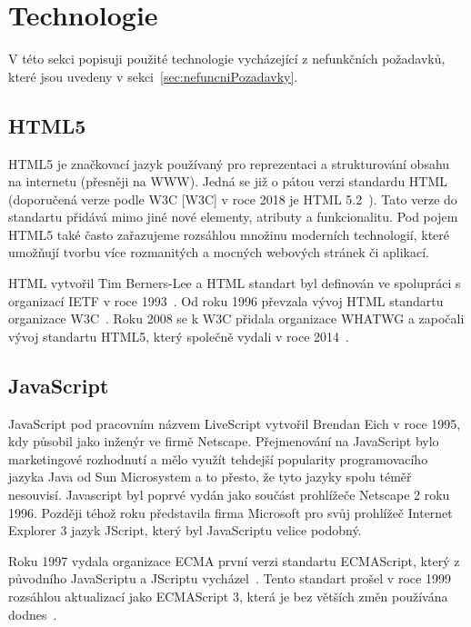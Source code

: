 
\section{Technologie}\label{sec:technologie}
V této sekci popisuji použité technologie vycházející z nefunkčních požadavků, které jsou uvedeny v sekci~\ref{sec:nefuncniPozadavky}.

\subsection{HTML5}\label{subsec:html5}

HTML5 je značkovací jazyk používaný pro reprezentaci a strukturování  obsahu na internetu (přesněji na \acrshort{WWW}).
Jedná se již o pátou verzi standardu \gls{HTML} (doporučená verze podle \acrlong{W3C} [\acrshort{W3C}] v roce 2018 je HTML 5.2~\cite{w3c:html52}).
Tato verze do standartu přidává mimo jiné nové elementy, atributy a funkcionalitu.
Pod pojem HTML5 také často zařazujeme rozsáhlou množinu moderních technologií, které umožňují tvorbu více rozmanitých a mocných webových stránek či aplikací.~\cite{mozzila:html5}

\gls{HTML} vytvořil Tim Berners-Lee a \gls{HTML} standart byl definován ve spolupráci s organizací \gls{IETF} v roce 1993~\cite{html:autor}.
Od roku 1996 převzala vývoj \gls{HTML} standartu organizace \gls{W3C}~\cite{w3c:html32}.
Roku 2008 se k \gls{W3C} přidala organizace \gls{WHATWG} a započali vývoj standartu HTML5, který společně vydali v roce 2014~\cite{w3c:html5}.

\subsection{JavaScript}\label{subsec:javascript}

JavaScript pod pracovním názvem LiveScript vytvořil Brendan Eich v roce 1995, kdy působil jako inženýr ve firmě Netscape.
Přejmenování na JavaScript bylo marketingové rozhodnutí a mělo využít tehdejší popularity programovacího jazyka Java od Sun Microsystem a to přesto, že tyto jazyky spolu téměř nesouvisí.
Javascript byl poprvé vydán jako součást prohlížeče Netscape 2 roku 1996.
Později téhož roku představila firma Microsoft pro svůj prohlížeč Internet Explorer 3 jazyk JScript, který byl JavaScriptu velice podobný.~\cite{mozzila:javascript}

Roku 1997 vydala organizace \gls{ECMA} první verzi standartu ECMAScript, který z původního JavaScriptu a JScriptu vycházel~\cite{ecma:ecmascript1}.
Tento standart prošel v roce 1999 rozsáhlou aktualizací jako ECMAScript 3, která je bez větších změn používána dodnes~\cite{mozzila:javascript}.

